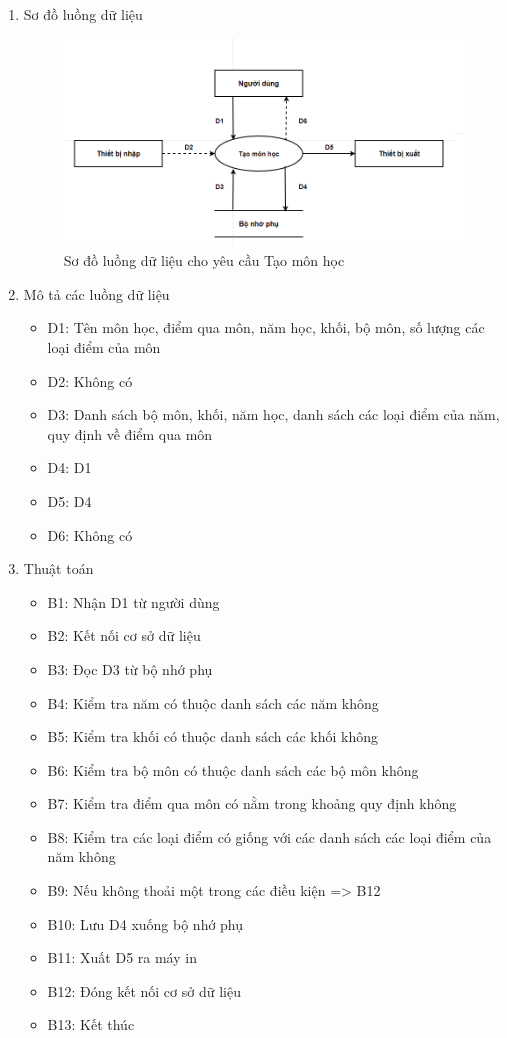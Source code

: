 \documentclass[a4paper]{article}
\begin{document}
\begin{enumerate}
\item Sơ đồ luồng dữ liệu
\begin{figure}[H] 
    \centering
    \includegraphics[width=1\textwidth]{dfd11} %
    \caption{Sơ đồ luồng dữ liệu cho yêu cầu Tạo môn học}
\end{figure}
\item Mô tả các luồng dữ liệu
\begin{itemize}
\item D1: Tên môn học, điểm qua môn, năm học, khối, bộ môn, số lượng các loại điểm của môn
\item D2: Không có
\item D3: Danh sách bộ môn, khối, năm học, danh sách các loại điểm của năm, quy định về điểm qua môn
\item D4: D1
\item D5: D4
\item D6: Không có
\end{itemize}
\item Thuật toán
\begin{itemize}
\item B1: Nhận D1 từ người dùng
\item B2: Kết nối cơ sở dữ liệu
\item B3: Đọc D3 từ bộ nhớ phụ
\item B4: Kiểm tra năm có thuộc danh sách các năm không
\item B5: Kiểm tra khối có thuộc danh sách các khối không
\item B6: Kiểm tra bộ môn có thuộc danh sách các bộ môn không
\item B7: Kiểm tra điểm qua môn có nằm trong khoảng quy định không
\item B8: Kiểm tra các loại điểm có giống với các danh sách các loại điểm của năm không
\item B9: Nếu không thoải một trong các điều kiện => B12
\item B10: Lưu D4 xuống bộ nhớ phụ
\item B11: Xuất D5 ra máy in
\item B12: Đóng kết nối cơ sở dữ liệu
\item B13: Kết thúc
\end{itemize}
\end{enumerate}	
\end{document}
